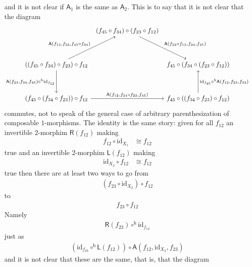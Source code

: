and it is not clear if $\mathsf{A}_{1}$ is the same as $\mathsf{A}_{2}$. This is to say that it is not clear that the diagram
\[
\begin{tikzcd}[row sep=3.5em,column sep=0.4em]
  &
  (f_{45} \circ f_{34})
  \circ
  (f_{23} \circ f_{12})
  \arrow{dr}{\mathsf{A}(f_{23} \circ f_{12},f_{34},f_{45})}
  &
  \\
  \left(
    (f_{45} \circ f_{34})
    \circ
    f_{23}
  \right)
  \circ
  f_{12}
  \arrow{ur}{\mathsf{A}(f_{12},f_{23},f_{45} \circ f_{34})}
  \arrow[swap]{d}{\mathsf{A}(f_{23},f_{34},f_{45}) \circ^{\textrm{h}} \mathrm{id}_{f_{12}}}
  &
  &
  f_{45}
  \circ
  \left(
    f_{34}
    \circ
    (f_{23} \circ f_{12})
  \right)
  \\
  \left(
    f_{45}
    \circ
    (f_{34} \circ f_{23})
  \right)
  \circ
  f_{12}
  \arrow{rr}{\mathsf{A}(f_{12},f_{34} \circ f_{23},f_{45})}
  &
  &
  f_{45}
  \circ
  \left(
    (f_{34} \circ f_{23})
    \circ
    f_{12}
  \right)
  \arrow[swap]{u}{\mathrm{id}_{f_{45}} \circ^{\textrm{h}} \mathsf{A}(f_{12},f_{23},f_{34})}
\end{tikzcd}
\]
commutes, not to speak of the general case of arbitrary parenthesization of composable $1$-morphisms. The identity is the same story: given for all $f_{12}$ an invertible $2$-morphim $\mathsf{R}(f_{12})$ making 
\begin{align*}
  f_{12}
  \circ
  \mathrm{id}_{X_{1}}
  &\cong
  f_{12}
\end{align*}
true and an invertible $2$-morphim $\mathsf{L}(f_{12})$ making 
\begin{align*}
  \mathrm{id}_{X_{2}}
  \circ
  f_{12}
  &\cong
  f_{12}
\end{align*}
true then there are at least two ways to go from
\begin{align*}
  \left(
    f_{23}
    \circ
    \mathrm{id}_{X_{2}}
  \right)
  \circ
  f_{12}
\end{align*}
to
\begin{align*}
  f_{23}
  \circ
  f_{12}
\end{align*}
Namely
\begin{align*}
  \mathsf{R}(f_{23})
  \circ^{\textrm{h}}
  \mathrm{id}_{f_{12}}
\end{align*}
just as
\begin{align*}
  \left(
    \mathrm{id}_{f_{23}}
    \circ^{\textrm{h}}
    \mathsf{L}(f_{12})
  \right)
  \circ
  \mathsf{A}(f_{12},\mathrm{id}_{X_{2}},f_{23})
\end{align*}
and it is not clear that these are the same, that is, that the diagram
